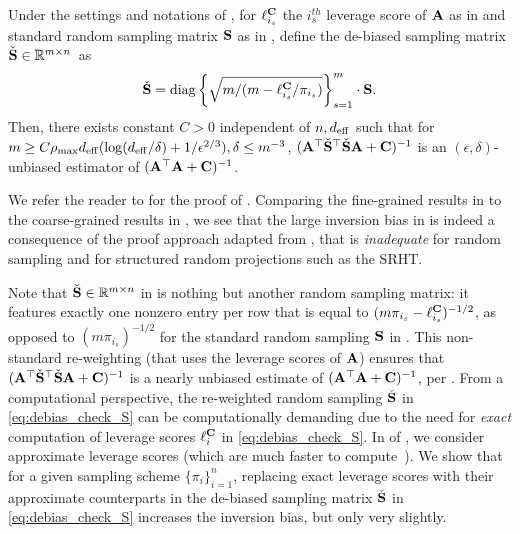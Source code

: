 \documentclass[11pt,a4paper]{article}
\begin{document}
\begin{proposition}\label{prop:debias}
Under the settings and notations of , for $\ell_{i_s}^\C$ the $i_s^{th}$ leverage score of $\A$ as in  and standard random sampling matrix $\S$ as in , define the de-biased sampling matrix $ \check\S \in \RR^{m\times n}$~as
\begin{align}\label{eq:debias_check_S}
  \check\S =\diag \left\{\sqrt{m/(m-\ell_{i_s}^\C/\pi_{i_s})} \right\}^m_{s=1}\cdot\S. %
\end{align}
Then, there exists constant $C > 0$ independent of $n,d_{\eff}$ such that for $m\geq C\rho_{\max} d_{\eff} (\log(d_{\eff}/\delta )+1/\epsilon^{2/3}), \delta\leq m^{-3}$, $(\A^\top \check\S^\top \check\S \A + \C )^{-1}$ is an $(\epsilon,\delta)$-unbiased estimator of $(\A^\top  \A + \C)^{-1}$.
\end{proposition}
We refer the reader to  for the proof of .
Comparing the fine-grained results in  to the coarse-grained results in , we see that the large inversion bias in  is indeed a consequence of the proof approach adapted from \citet{derezinski2021newtonless,derezinski2021sparse}, that is \emph{inadequate} for random sampling and for structured random projections such as the SRHT.
%
%
%
\begin{remark}\normalfont\label{rem:check S scheme}
Note that $\check\S \in \RR^{m \times n}$ in  is nothing but another random sampling matrix: it features exactly one nonzero entry per row that is equal to $(m \pi_{i_s} - \ell_{i_s}^\C)^{-1/2}$, as opposed to $(m \pi_{i_s})^{-1/2}$ for the standard random sampling $\S$ in .
This non-standard re-weighting (that uses the leverage scores of $\A$) ensures that $(\A^\top \check{\S}^\top \check\S \A + \C )^{-1}$ is a nearly unbiased estimate of $(\A^\top \A + \C)^{-1}$, per . 
From a computational perspective, the re-weighted random sampling $\check{\S}$ in \eqref{eq:debias_check_S} can be computationally demanding due to the need for \emph{exact} computation of leverage scores $\ell_i^\C$ in \eqref{eq:debias_check_S}.
In  of , we consider approximate leverage scores (which are much faster to compute~\citep{drineas2012fast,clarkson2017low,cohen2017input}).
We show that for a given sampling scheme $\{ \pi_i \}_{i=1}^n$, replacing  exact leverage scores with their approximate counterparts in the de-biased sampling matrix $\check \S$ in \eqref{eq:debias_check_S} increases the inversion bias, but only very slightly.
\end{remark}
\end{document}
